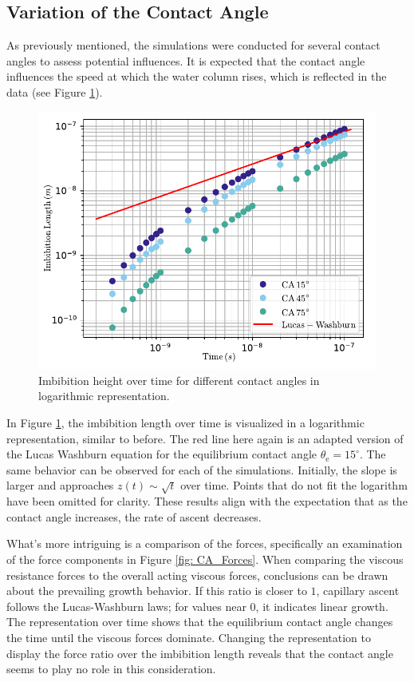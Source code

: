\subsection{Variation of the Contact Angle}
As previously mentioned, the simulations were conducted for several contact angles to assess potential influences. It is expected that the contact angle influences the speed at which the water column rises, which is reflected in the data (see Figure \ref{fig: CAVar_z_overTime}).
\begin{figure}[h]
    \centering
    \includegraphics[width=.95\textwidth]{Pictures/loglog_z_over__time_CA_Var.pdf}
    \caption{Imbibition height over time for different contact angles in logarithmic representation.}
    \label{fig: CAVar_z_overTime} 
\end{figure}
In Figure \ref{fig: CAVar_z_overTime}, the imbibition length over time is visualized in a logarithmic representation, similar to before. The red line here again is an adapted version of the Lucas Washburn equation for the equilibrium contact angle $\theta_{\mathrm{e}}= 15^{\circ}$. The same behavior can be observed for each of the simulations. Initially, the slope is larger and approaches $z(t)\sim \sqrt{t}$ over time. Points that do not fit the logarithm have been omitted for clarity. These results align with the expectation that as the contact angle increases, the rate of ascent decreases.

What's more intriguing is a comparison of the forces, specifically an examination of the force components in Figure \ref{fig: CA_Forces}. When comparing the viscous resistance forces to the overall acting viscous forces, conclusions can be drawn about the prevailing growth behavior. If this ratio is closer to $1$, capillary ascent follows the Lucas-Washburn laws; for values near $0$, it indicates linear growth. The representation over time shows that the equilibrium contact angle changes the time until the viscous forces dominate. Changing the representation to display the force ratio over the imbibition length reveals that the contact angle seems to play no role in this consideration.

